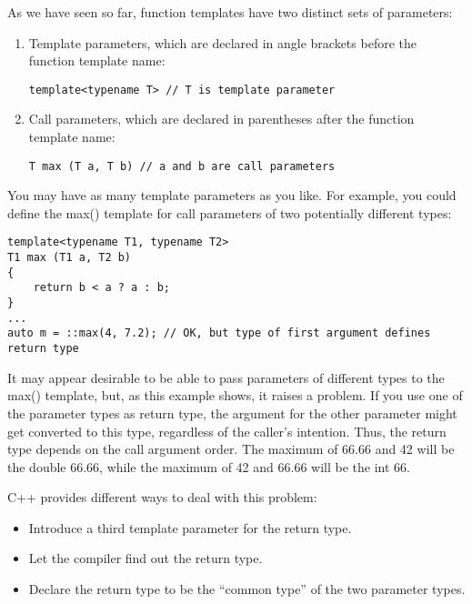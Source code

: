
As we have seen so far, function templates have two distinct sets of parameters:

\begin{enumerate}
\item 
Template parameters, which are declared in angle brackets before the function template name:
\begin{lstlisting}[style=styleCXX]
template<typename T> // T is template parameter
\end{lstlisting}

\item 
Call parameters, which are declared in parentheses after the function template name:
\begin{lstlisting}[style=styleCXX]
T max (T a, T b) // a and b are call parameters
\end{lstlisting}
\end{enumerate}

You may have as many template parameters as you like. For example, you could define the max() template for call parameters of two potentially different types:

\begin{lstlisting}[style=styleCXX]
template<typename T1, typename T2>
T1 max (T1 a, T2 b)
{
	return b < a ? a : b;
}
...
auto m = ::max(4, 7.2); // OK, but type of first argument defines return type
\end{lstlisting}

It may appear desirable to be able to pass parameters of different types to the max() template, but, as this example shows, it raises a problem. If you use one of the parameter types as return type, the argument for the other parameter might get converted to this type, regardless of the caller’s intention. Thus, the return type depends on the call argument order. The maximum of 66.66 and 42 will be the double 66.66, while the maximum of 42 and 66.66 will be the int 66.

C++ provides different ways to deal with this problem:

\begin{itemize}
\item
Introduce a third template parameter for the return type.

\item
Let the compiler find out the return type.

\item
Declare the return type to be the “common type” of the two parameter types.
\end{itemize}

